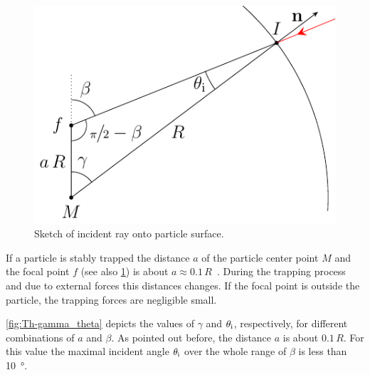 \begin{figure}[thp]
  \centering
  \includegraphics[]{Plots/cache/angles.pdf}
  \caption{Sketch of incident ray onto particle surface.}
  \label{fig:Th-angles}
\end{figure}

If a particle is stably trapped the distance $a$ of the particle center point 
$M$ and the focal point $f$ (see also \cref{fig:Th-angles}) is about $a \approx 
0.1\,R$~\cite{Lamprecht2017}. During the trapping process and due to external 
forces this distances changes. If the focal point is outside the particle, the 
trapping forces are negligible small.

\cref{fig:Th-gamma_theta} depicts the values of $\gamma$ and $\theta_{\mathrm{i}}$, 
respectively, for different combinations of $a$ and $\beta$. As pointed out 
before, the distance $a$ is about $0.1\,R$. For this value the maximal incident 
angle $\theta_{\mathrm{i}}$ over the whole range of $\beta$ is less than 
\SI{10}{\degree}.

